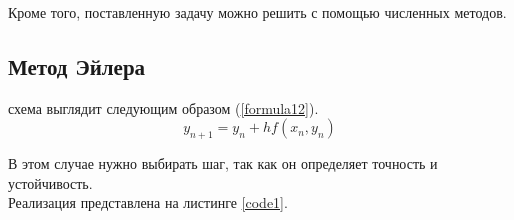 Кроме того, поставленную задачу можно решить с помощью численных методов.

\subsection*{Метод Эйлера}
 схема выглядит следующим образом (\ref{formula12}).
\begin{equation}\label{formula12}
	y_{n + 1} = y_n + hf(x_n, y_n)
\end{equation}

В этом случае нужно выбирать шаг, так как он определяет точность и устойчивость.\\
Реализация представлена на листинге \ref{code1}.\\

